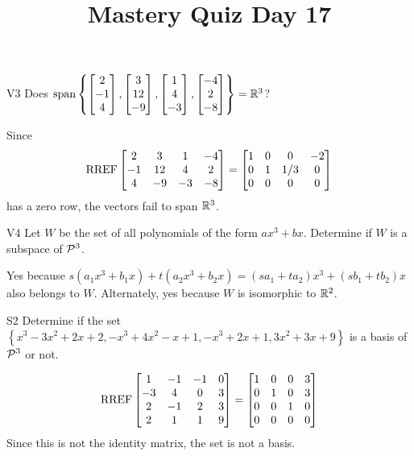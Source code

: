 \documentclass{sbgLAquiz}
\title{Mastery Quiz Day 17 }
\begin{document}
\begin{problem}{V3}
Does
\(
  \operatorname{span}\left\{
    \begin{bmatrix} 2 \\ -1 \\ 4 \end{bmatrix},
    \begin{bmatrix} 3 \\ 12 \\ -9 \end{bmatrix},
    \begin{bmatrix} 1 \\ 4 \\ -3 \end{bmatrix},
    \begin{bmatrix} -4 \\ 2 \\ -8 \end{bmatrix}
  \right\} = \IR^3
\)?
\end{problem}
\begin{solution}
Since
\[
  \RREF\begin{bmatrix}
    2 & 3 & 1 & -4 \\
    -1 & 12 & 4 & 2 \\
    4 & -9 & -3 & -8
  \end{bmatrix} =
  \begin{bmatrix}
    1 & 0 & 0 & -2 \\
    0 & 1 & 1/3 & 0 \\
    0 & 0 & 0 & 0
  \end{bmatrix}
\]
has a zero row, the vectors fail to span \(\IR^3\).
\end{solution}

\begin{problem}{V4} Let $W$ be the set of all polynomials of the form
\(ax^3+bx\).  Determine if $W$ is a subspace of \(\P^3\).
\end{problem}
\begin{solution}
Yes because \(s(a_1x^3+b_1x)+t(a_2x^3+b_2x)=
(sa_1+ta_2)x^3+(sb_1+tb_2)x\) also belongs to \(W\).
Alternately, yes because \(W\) is isomorphic to \(\IR^2\).
\end{solution}


\begin{extract}\newpage\end{extract}
\begin{problem}{S2}
Determine if the set $\left\{ x^3-3x^2+2x+2, -x^3+4x^2-x+1, -x^3+2x+1, 3x^2+3x+9 \right\}$ is a basis of $\P^3$ or not.
\end{problem}

\begin{solution}
$$\RREF \begin{bmatrix} 1 & -1 & -1 & 0 \\ -3 & 4 & 0 & 3 \\ 2 & -1 & 2 & 3 \\ 2 & 1 & 1 & 9 \end{bmatrix}=\begin{bmatrix} 1 &0 & 0 & 3 \\ 0 & 1 & 0 & 3 \\ 0 & 0 & 1 & 0 \\ 0 & 0 & 0 & 0 \end{bmatrix}$$
Since this is not the identity matrix, the set is not a basis.
\end{solution}
\end{document}
